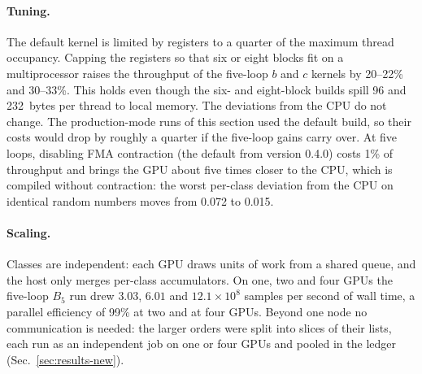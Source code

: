 \paragraph{Tuning.}
The default kernel is limited by registers to a quarter of the maximum thread occupancy. Capping the registers so that
six or eight blocks fit on a multiprocessor raises the throughput of the five-loop $b$ and $c$ kernels by 20--22\% and
30--33\%. This holds even though the six- and eight-block builds spill
96 and 232~bytes per thread to local memory. The deviations from the CPU do not change. The production-mode runs
of this section used the default build, so their costs would drop by roughly a quarter if the five-loop gains carry
over. At five loops, disabling FMA contraction (the default from version 0.4.0) costs 1\% of throughput and brings the
GPU about five times closer to the CPU, which is compiled without contraction: the worst per-class deviation from the
CPU on identical random numbers moves from 0.072 to 0.015.

\paragraph{Scaling.}
Classes are independent: each GPU draws units of work from a shared queue, and the host only merges per-class
accumulators. On one, two and four GPUs the five-loop
$B_5$ run drew $3.03$, $6.01$ and $12.1\times10^{8}$ samples per second of wall time, a parallel
efficiency of 99\% at two and at four GPUs. Beyond one node no communication is needed: the larger orders were
split into slices of their lists, each run as an independent job on one or four GPUs and pooled in the ledger
(Sec.~\ref{sec:results-new}).

